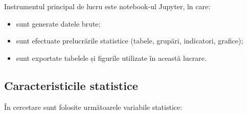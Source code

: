 \documentclass[12pt,a4paper]{report}
\begin{document}
Instrumentul principal de lucru este notebook-ul Jupyter, în care:
\begin{itemize}
  \item sunt generate datele brute;
  \item sunt efectuate prelucrările statistice (tabele, grupări, indicatori, grafice);
  \item sunt exportate tabelele și figurile utilizate în această lucrare.

\end{itemize}

\subsection{Caracteristicile statistice}

În cercetare sunt folosite următoarele variabile statistice:
\end{document}
